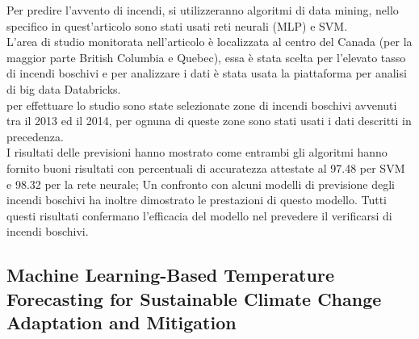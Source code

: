 Per predire l'avvento di incendi, si utilizzeranno algoritmi di data mining, nello specifico in quest'articolo sono stati usati reti neurali (MLP) e SVM.\\
L'area di studio monitorata nell'articolo è localizzata al centro del Canada (per la maggior parte British Columbia e Quebec), essa è stata scelta per l'elevato tasso di incendi boschivi e per analizzare i dati è stata usata la piattaforma per analisi di big data Databricks.\\
per effettuare lo studio sono state selezionate zone di incendi boschivi avvenuti tra il 2013 ed il 2014, per ognuna di queste zone sono stati usati i dati descritti in precedenza.\\
I risultati delle previsioni hanno mostrato come entrambi gli algoritmi hanno fornito buoni risultati con percentuali di accuratezza attestate al 97.48 per SVM e 98.32 per la rete neurale; Un confronto con alcuni modelli di previsione degli incendi boschivi ha inoltre dimostrato le prestazioni di questo modello. Tutti questi risultati confermano l'efficacia del modello nel prevedere il verificarsi di incendi boschivi.

\subsection{Machine Learning-Based Temperature Forecasting for Sustainable Climate Change Adaptation and Mitigation}

